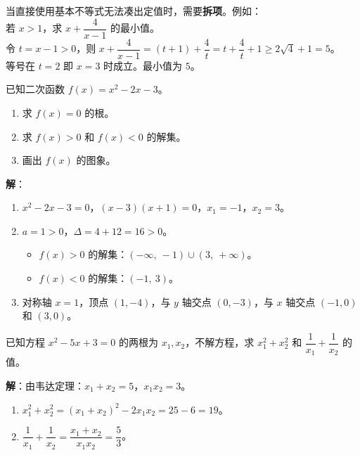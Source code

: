 \documentclass[12pt, a4paper]{ctexart}
\begin{document}
\begin{warnbox}[提醒：凑定值的技巧]
当直接使用基本不等式无法凑出定值时，需要\textbf{拆项}。例如：\\
若 $x > 1$，求 $x + \dfrac{4}{x - 1}$ 的最小值。\\
令 $t = x - 1 > 0$，则 $x + \dfrac{4}{x-1} = (t + 1) + \dfrac{4}{t} = t + \dfrac{4}{t} + 1 \geq 2\sqrt{4} + 1 = 5$。\\
等号在 $t = 2$ 即 $x = 3$ 时成立。最小值为 $5$。
\end{warnbox}

\begin{examplebox}[【例6】二次函数与方程根的关系]
已知二次函数 $f(x) = x^2 - 2x - 3$。
\begin{enumerate}[label=(\arabic*)]
  \item 求 $f(x) = 0$ 的根。
  \item 求 $f(x) > 0$ 和 $f(x) < 0$ 的解集。
  \item 画出 $f(x)$ 的图象。
\end{enumerate}
\end{examplebox}

\textbf{解}：
\begin{enumerate}[label=(\arabic*)]
  \item $x^2 - 2x - 3 = 0$，$(x-3)(x+1) = 0$，$x_1 = -1$，$x_2 = 3$。
  \item $a = 1 > 0$，$\Delta = 4 + 12 = 16 > 0$。
    \begin{itemize}
      \item $f(x) > 0$ 的解集：$(-\infty,\ -1) \cup (3,\ +\infty)$。
      \item $f(x) < 0$ 的解集：$(-1,\ 3)$。
    \end{itemize}
  \item 对称轴 $x = 1$，顶点 $(1, -4)$，与 $y$ 轴交点 $(0, -3)$，与 $x$ 轴交点 $(-1, 0)$ 和 $(3, 0)$。
\end{enumerate}

\begin{examplebox}[【例7】韦达定理的应用]
已知方程 $x^2 - 5x + 3 = 0$ 的两根为 $x_1, x_2$，不解方程，求 $x_1^2 + x_2^2$ 和 $\dfrac{1}{x_1} + \dfrac{1}{x_2}$ 的值。
\end{examplebox}

\textbf{解}：由韦达定理：$x_1 + x_2 = 5$，$x_1 x_2 = 3$。

\begin{enumerate}[leftmargin=2em]
  \item $x_1^2 + x_2^2 = (x_1 + x_2)^2 - 2x_1 x_2 = 25 - 6 = \boxed{19}$。
  \item $\dfrac{1}{x_1} + \dfrac{1}{x_2} = \dfrac{x_1 + x_2}{x_1 x_2} = \dfrac{5}{3}$。
\end{enumerate}
\end{document}
